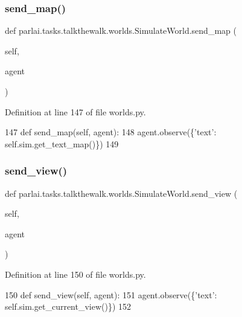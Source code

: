 \subsubsection{\texorpdfstring{send\+\_\+map()}{send\_map()}}
{\footnotesize\ttfamily def parlai.\+tasks.\+talkthewalk.\+worlds.\+Simulate\+World.\+send\+\_\+map (\begin{DoxyParamCaption}\item[{}]{self,  }\item[{}]{agent }\end{DoxyParamCaption})}



Definition at line 147 of file worlds.\+py.


\begin{DoxyCode}
147     \textcolor{keyword}{def }send\_map(self, agent):
148         agent.observe(\{\textcolor{stringliteral}{'text'}: self.sim.get\_text\_map()\})
149 
\end{DoxyCode}
\mbox{\label{classparlai_1_1tasks_1_1talkthewalk_1_1worlds_1_1SimulateWorld_a6198679191b1f38d9c503372c99a8879}} 
\subsubsection{\texorpdfstring{send\+\_\+view()}{send\_view()}}
{\footnotesize\ttfamily def parlai.\+tasks.\+talkthewalk.\+worlds.\+Simulate\+World.\+send\+\_\+view (\begin{DoxyParamCaption}\item[{}]{self,  }\item[{}]{agent }\end{DoxyParamCaption})}



Definition at line 150 of file worlds.\+py.


\begin{DoxyCode}
150     \textcolor{keyword}{def }send\_view(self, agent):
151         agent.observe(\{\textcolor{stringliteral}{'text'}: self.sim.get\_current\_view()\})
152 
\end{DoxyCode}
\mbox{\label{classparlai_1_1tasks_1_1talkthewalk_1_1worlds_1_1SimulateWorld_ab11f69df41dbfe8552855eef15902a95}} 
